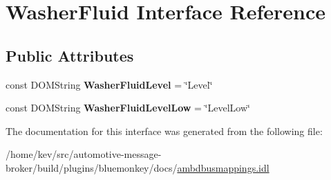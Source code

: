\hypertarget{interfaceWasherFluid}{\section{Washer\+Fluid Interface Reference}
\label{interfaceWasherFluid}
}
\subsection*{Public Attributes}
\begin{DoxyCompactItemize}
\item 
\hypertarget{interfaceWasherFluid_aa1ddc39b08b28e3d3688604b1b07885b}{const D\+O\+M\+String {\bfseries Washer\+Fluid\+Level} = \char`\"{}Level\char`\"{}}\label{interfaceWasherFluid_aa1ddc39b08b28e3d3688604b1b07885b}

\item 
\hypertarget{interfaceWasherFluid_ac9e7989758c74fc5ccee1e876bfc6a4b}{const D\+O\+M\+String {\bfseries Washer\+Fluid\+Level\+Low} = \char`\"{}Level\+Low\char`\"{}}\label{interfaceWasherFluid_ac9e7989758c74fc5ccee1e876bfc6a4b}

\end{DoxyCompactItemize}


The documentation for this interface was generated from the following file\+:\begin{DoxyCompactItemize}
\item 
/home/kev/src/automotive-\/message-\/broker/build/plugins/bluemonkey/docs/\hyperlink{ambdbusmappings_8idl}{ambdbusmappings.\+idl}\end{DoxyCompactItemize}
